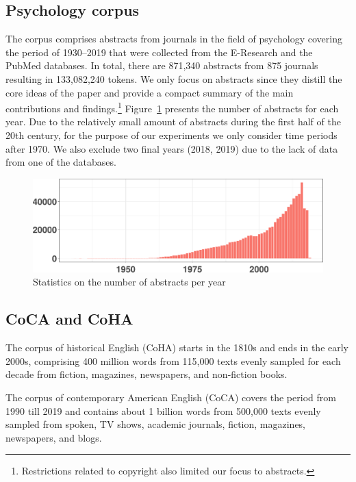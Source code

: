 \documentclass[output=paper]{langsci/langscibook}
\begin{document}
\subsection{Psychology corpus}

The corpus comprises abstracts from journals in the field of psychology covering the period of 1930--2019 that were collected from the E-Research and the PubMed databases.
In total, there are 871,340 abstracts from 875 journals resulting in 133,082,240 tokens.  We only focus on abstracts since they distill the core ideas of the paper and provide a compact summary of the main contributions and findings.\footnote{Restrictions related to copyright also limited our focus to abstracts.}  
Figure~\ref{fig:year-pubs} presents the number of abstracts for each year.
Due to the relatively small amount of abstracts during the first half of the 20th century, for the purpose of our experiments we only consider time periods after 1970. We also exclude two final years (2018, 2019) due to the lack of data from one of the databases.   

\begin{figure}
  \includegraphics[width=\textwidth]{figures/VYLOMOVA_yearstats_cropped.pdf}
\caption{Statistics on the number of abstracts per year}
\label{fig:year-pubs}
\end{figure}


\subsection{CoCA and CoHA}

The corpus of historical English (CoHA) starts in the 1810s and ends in the early 2000s, comprising 400 million words from 115,000 texts evenly sampled for each decade from fiction, magazines, newspapers, and non-fiction books.

The corpus of contemporary American English (CoCA) covers the period from 1990 till 2019 and contains about 1 billion words from 500,000 texts evenly sampled from spoken, TV shows, academic journals, fiction, magazines, newspapers, and blogs.
\end{document}
